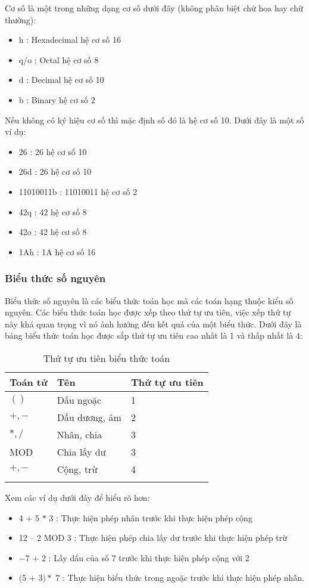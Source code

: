 	Cơ số là một trong những dạng cơ số dưới đây (không phân biệt chứ hoa hay chữ thường):
		\begin{itemize}
		\renewcommand{\labelitemi}{\textbullet}	
			\item	h	: Hexadecimal hệ cơ số 16
			\item	q/o	: Octal hệ cơ số 8
			\item	d	: Decimal hệ cơ số 10
			\item	b	: Binary hệ cơ số 2
		\end{itemize}			
	Nếu không có ký hiệu cơ số thì mặc định số đó là hệ cơ số 10. Dưới đây là một số ví dụ:
	\begin{itemize}
	\item	26		: 26 hệ cơ số 10
	\item	26d		: 26 hệ cơ số 10
	\item	11010011b	: 11010011 hệ cơ số 2
	\item	42q		: 42 hệ cơ số 8
	\item	42o		: 42 hệ cơ số 8
	\item	1Ah		: 1A hệ cơ số 16
	\end{itemize}	
	
	\subsubsection*{Biểu thức số nguyên}
	Biểu thức số nguyên là các biểu thức toán học mà các toán hạng thuộc kiểu số nguyên. Các biểu thức toán học được xếp theo thứ tự ưu tiên, việc xếp thứ tự này khá quan trọng vì nó ảnh hưởng đến kết quả của một biểu thức. Dưới đây là bảng biểu thức toán học được sắp thứ tự ưu tiên cao nhất là 1 và thấp nhất là 4:	\\
	\begin{longtable}{ | m{3cm} | m{5cm} |m{5cm} |}
			\hline
				Toán tử &	Tên &	Thứ tự ưu tiên\\
			\hline
			\hline
			$()$	 &	Dấu ngoặc&		1\\
			\hline
			$+, -$ &		Dấu dương, âm&		2\\
			\hline
			$*, /$	&	Nhân, chia&		3\\
			\hline
			MOD	&	Chia lấy dư&		3\\
			\hline
			$+,-$	&	Cộng, trừ	&	4\\
			\hline
			\caption{Thứ tự ưu tiên biểu thức toán}
	\end{longtable}
	Xem các ví dụ dưới đây để hiểu rõ hơn:
	\begin{itemize}
	\item  4 $+$ 5 $*$ 3 		: Thực hiện phép nhân trước khi thực hiện phép cộng
	\item	 12 – 2 MOD 3	: Thực hiện phép chia lấy dư trước khi thực hiện phép trừ
	\item	 $-$7 $+$ 2			: Lấy dấu của số 7 trước khi thực hiện phép cộng với 2
	\item	$($5 $+$ 3$) *$ 7		: Thực hiện biểu thức trong ngoặc trước khi thực hiện phép nhân. 
	\end{itemize}
	
